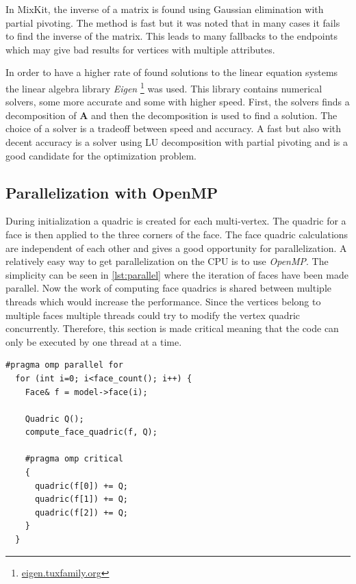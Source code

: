 In MixKit, the inverse of a matrix is found using Gaussian elimination with partial pivoting. The method is fast but it was noted that in many cases it fails to find the inverse of the matrix. This leads to many fallbacks to the endpoints which may give bad results for vertices with multiple attributes.

In order to have a higher rate of found solutions to the linear equation systems the linear algebra library \emph{Eigen} \footnote{\href{http://eigen.tuxfamily.org}{eigen.tuxfamily.org}} was used. This library contains numerical solvers, some more accurate and some with higher speed. First, the solvers finds a decomposition of \(\mathbf{A}\) and then the decomposition is used to find a solution. The choice of a solver is a tradeoff between speed and accuracy. A fast but also with decent accuracy is a solver using LU decomposition with partial pivoting and is a good candidate for the optimization problem. 

\subsection{Parallelization with OpenMP}
During initialization a quadric is created for each multi-vertex. The quadric for a face is then applied to the three corners of the face. The face quadric calculations are independent of each other and gives a good opportunity for parallelization. A relatively easy way to get parallelization on the CPU is to use \emph{OpenMP}. The simplicity can be seen in \cref{lst:parallel} where the iteration of faces have been made parallel. Now the work of computing face quadrics is shared between multiple threads which would increase the performance. Since the vertices belong to multiple faces multiple threads could try to modify the vertex quadric concurrently. Therefore, this section is made critical meaning that the code can only be executed by one thread at a time.


\begin{minipage}{\textwidth}
\begin{lstlisting}[caption={Parallelization with OpenMP}, label={lst:parallel}]
  #pragma omp parallel for
  for (int i=0; i<face_count(); i++) {
    Face& f = model->face(i);

    Quadric Q();
    compute_face_quadric(f, Q);

    #pragma omp critical
    {
      quadric(f[0]) += Q;
      quadric(f[1]) += Q;
      quadric(f[2]) += Q;
    }
  }
\end{lstlisting}
\end{minipage}

